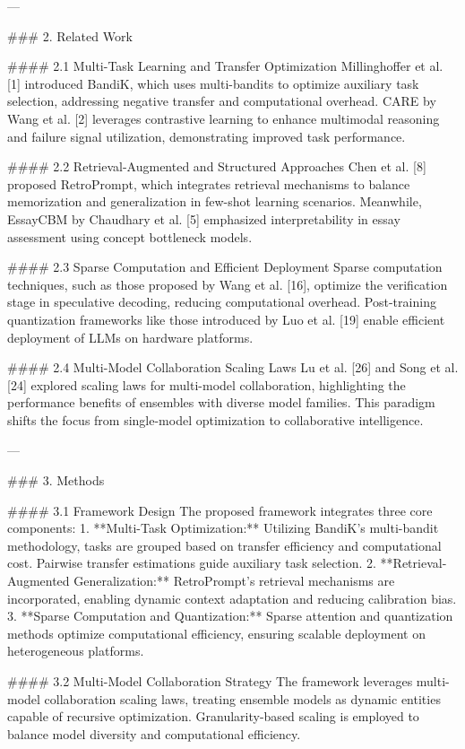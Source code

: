 ---

### 2. Related Work  

#### 2.1 Multi-Task Learning and Transfer Optimization  
Millinghoffer et al. [1] introduced BandiK, which uses multi-bandits to optimize auxiliary task selection, addressing negative transfer and computational overhead. CARE by Wang et al. [2] leverages contrastive learning to enhance multimodal reasoning and failure signal utilization, demonstrating improved task performance.  

#### 2.2 Retrieval-Augmented and Structured Approaches  
Chen et al. [8] proposed RetroPrompt, which integrates retrieval mechanisms to balance memorization and generalization in few-shot learning scenarios. Meanwhile, EssayCBM by Chaudhary et al. [5] emphasized interpretability in essay assessment using concept bottleneck models.  

#### 2.3 Sparse Computation and Efficient Deployment  
Sparse computation techniques, such as those proposed by Wang et al. [16], optimize the verification stage in speculative decoding, reducing computational overhead. Post-training quantization frameworks like those introduced by Luo et al. [19] enable efficient deployment of LLMs on hardware platforms.  

#### 2.4 Multi-Model Collaboration Scaling Laws  
Lu et al. [26] and Song et al. [24] explored scaling laws for multi-model collaboration, highlighting the performance benefits of ensembles with diverse model families. This paradigm shifts the focus from single-model optimization to collaborative intelligence.  

---

### 3. Methods  

#### 3.1 Framework Design  
The proposed framework integrates three core components:  
1. **Multi-Task Optimization:** Utilizing BandiK's multi-bandit methodology, tasks are grouped based on transfer efficiency and computational cost. Pairwise transfer estimations guide auxiliary task selection.  
2. **Retrieval-Augmented Generalization:** RetroPrompt's retrieval mechanisms are incorporated, enabling dynamic context adaptation and reducing calibration bias.  
3. **Sparse Computation and Quantization:** Sparse attention and quantization methods optimize computational efficiency, ensuring scalable deployment on heterogeneous platforms.  

#### 3.2 Multi-Model Collaboration Strategy  
The framework leverages multi-model collaboration scaling laws, treating ensemble models as dynamic entities capable of recursive optimization. Granularity-based scaling is employed to balance model diversity and computational efficiency.  

